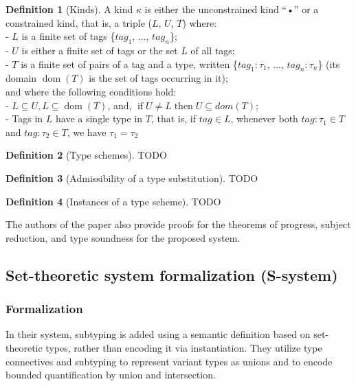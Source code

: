 \documentclass[a4paper,11pt,oneside]{article}
\theoremstyle{definition}
\newtheorem{defsec}{Definition}[section]
\begin{document}
\begin{defsec}[Kinds]
  A kind $\kappa$ is either the unconstrained kind “•” or a constrained
  kind, that is, a triple ($L$, $U$, $T$) where:\\
  - $L$ is a finite set of tags \{$tag_1$, ..., $tag_n$\};\\
  - $U$ is either a finite set of tags or the set $L$ of all tags;\\
  - $T$ is a finite set of pairs of a tag and a type, written \{$tag_1 : \tau_1$,
  ..., $tag_n : \tau_n$\} (its domain $\operatorname{dom}(T)$ is the set of tags occurring
  in it);\\
  and where the following conditions hold:\\
  - $L \subseteq U , L \subseteq \operatorname{dom}(T)$, and,
  $\operatorname{if} U \not= L \operatorname{then} U \subseteq dom(T)$;\\
  - Tags in $L$ have a single type in $T$, that is, if $tag \in L$, whenever
  both $tag : \tau_1 \in T$ and $tag : \tau_2 \in T$, we have $\tau_1 = \tau_2$\\
\end{defsec}

\begin{defsec}[Type schemes]
  TODO
\end{defsec}

\begin{defsec}[Admissibility of a type substitution]
  TODO
\end{defsec}

\begin{defsec}[Instances of a type scheme]
  TODO
\end{defsec}

The authors of the paper also provide proofs for the theorems of
progress, subject reduction, and type soundness for the proposed system.

\subsection{Set-theoretic system formalization (S-system)}
\subsubsection{Formalization}

In their system, subtyping is added using a semantic definition
based on set-theoretic types, rather than encoding it via
instantiation. They utilize type connectives and subtyping to
represent variant types as unions and to encode bounded quantification
by union and intersection.
\end{document}
